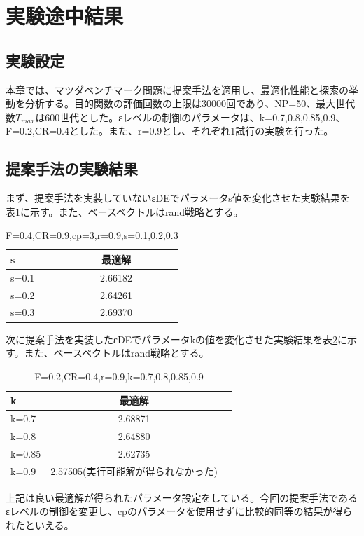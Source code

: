 \documentclass[twocolumn,10pt]{jarticle}
\begin{document}
\section{実験途中結果}
\subsection{実験設定}
本章では、マツダベンチマーク問題に提案手法を適用し、最適化性能と探索の挙動を分析する。目的関数の評価回数の上限は30000回であり、NP=50、最大世代数${T}_{max}$は600世代とした。εレベルの制御のパラメータは、k={0.7,0.8,0.85,0.9}、F=0.2,CR=0.4とした。また、r=0.9とし、それぞれ1試行の実験を行った。

\subsection{提案手法の実験結果}
まず、提案手法を実装していないεDEでパラメータs値を変化させた実験結果を表\ref{tbl:MLP1}に示す。また、ベースベクトルはrand戦略とする。
\begin{table}[htbp]
\begin{center}
\caption{F=0.4,CR=0.9,cp=3,r=0.9,s=0.1,0.2,0.3}
\label{tbl:MLP1}
\begin{tabular}{|l|c|c|}
\hline
s     & 最適解  \\ \hline
s=0.1 & 2.66182	\\ \hline
s=0.2 & 2.64261 \\ \hline
s=0.3 & 2.69370 \\ \hline
\end{tabular}
\end{center}
\end{table}


次に提案手法を実装したεDEでパラメータkの値を変化させた実験結果を表\ref{tbl:MLP2}に示す。また、ベースベクトルはrand戦略とする。

\begin{table}[htbp]
\begin{center}
\caption{F=0.2,CR=0.4,r=0.9,k={0.7,0.8,0.85,0.9}}
\label{tbl:MLP2}
\begin{tabular}{|l|c|c|}
\hline
k     & 最適解  \\ \hline
k=0.7 & 2.68871\\ \hline
k=0.8 & 2.64880\\ \hline
k=0.85 & 2.62735\\ \hline
k=0.9 & 2.57505(実行可能解が得られなかった)\\ \hline
\end{tabular}
\end{center}
\end{table}
上記は良い最適解が得られたパラメータ設定をしている。今回の提案手法であるεレベルの制御を変更し、cpのパラメータを使用せずに比較的同等の結果が得られたといえる。
\end{document}
